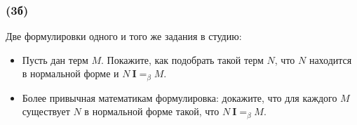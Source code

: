 \documentclass{article}
\newcommand{\comb}[1]{\mathbf{#1}}
\newcommand{\eqbeta}{=_\beta}
\begin{document}
    \subsubsection{(3б)}

    Две формулировки одного и того же задания в студию:
    \begin{itemize}
        \item Пусть дан терм $M$.
        Покажите, как подобрать такой терм $N$, что $N$ находится в нормальной форме и $N~\comb{I} =_\beta M$.
        \item Более привычная математикам формулировка: докажите, что для каждого $M$ существует $N$ в нормальной форме такой, что $N~\comb{I} \eqbeta M$.
    \end{itemize}
\end{document}
